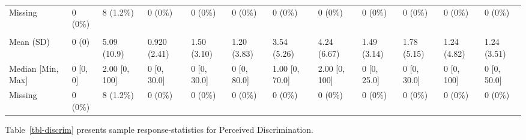 \documentclass[
  single column]{article}
\begin{document}
\begin{landscape}
\begin{longtable}[t]{llllllllllll}
\hspace{1em}Missing & 0 (0\%) & 8 (1.2\%) & 0 (0\%) & 0 (0\%) & 0 (0\%) & 0 (0\%) & 0 (0\%) & 0 (0\%) & 0 (0\%) & 0 (0\%) & 0 \vphantom{1} (0\%)\\
\addlinespace[0.3em]
\multicolumn{12}{l}{\textbf{Weekly Scripture}}\\
\hspace{1em}Mean (SD) & 0 (0) & 5.09 (10.9) & 0.920 (2.41) & 1.50 (3.10) & 1.20 (3.83) & 3.54 (5.26) & 4.24 (6.67) & 1.49 (3.14) & 1.78 (5.15) & 1.24 (4.82) & 1.24 (3.51)\\
\hspace{1em}Median [Min, Max] & 0 [0, 0] & 2.00 [0, 100] & 0 [0, 30.0] & 0 [0, 30.0] & 0 [0, 80.0] & 1.00 [0, 70.0] & 2.00 [0, 100] & 0 [0, 25.0] & 0 [0, 30.0] & 0 [0, 100] & 0 [0, 50.0]\\
\hspace{1em}Missing & 0 (0\%) & 8 (1.2\%) & 0 (0\%) & 0 (0\%) & 0 (0\%) & 0 (0\%) & 0 (0\%) & 0 (0\%) & 0 (0\%) & 0 (0\%) & 0 (0\%)\\*

\end{longtable}

\endgroup{}


\end{landscape}

\newpage{}

Table~\ref{tbl-discrim} presents sample response-statistics for
Perceived Discrimination.
\end{document}

